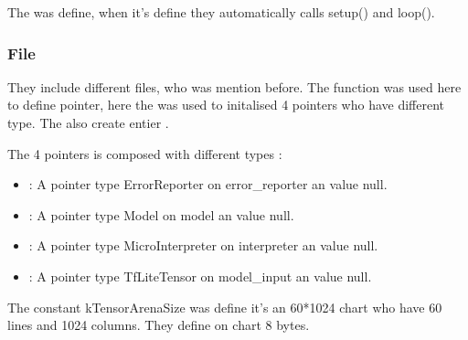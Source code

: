 The  was define, when it's define they automatically calls setup() and loop().

\begin{center}
    \label{Magic Wand main function}
\end{center}


\subsubsection{File }

\begin{center}
    \label{Magic Wand function}
\end{center}

They include different files, who was mention before. The function  was used here to define pointer, here the was used to initalised 4 pointers who have different type.
The also create entier .  

The 4 pointers is composed with different types : 
\begin{itemize}
    \item {}: A pointer type ErrorReporter on error\_reporter an value null.
    \item {}: A pointer type Model on model an value null.
    \item {}: A pointer type MicroInterpreter on interpreter an value null.
    \item {}: A pointer type TfLiteTensor on model\_input an value null.
\end{itemize}


\begin{center}
    \label{Magic Wand function}
\end{center}

The constant kTensorArenaSize was define it's an 60*1024 chart who have 60 lines and 1024 columns. They define  on chart 8 bytes. 

